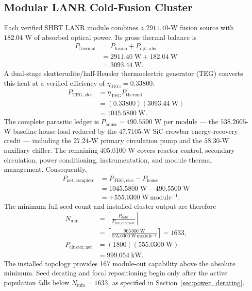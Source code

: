 \documentclass[10pt,twocolumn]{IEEEtran}
\begin{document}
\subsection{Modular LANR Cold-Fusion Cluster}

Each verified SHBT LANR module combines a $2911.40$-W fusion source with $182.04$ W of absorbed optical power.  Its gross thermal balance is
\begin{equation}
\begin{aligned}
P_{\mathrm{thermal}}
&=P_{\mathrm{fusion}}+P_{\mathrm{opt,abs}} \\
&=2911.40\;\mathrm{W}+182.04\;\mathrm{W} \\
&=3093.44\;\mathrm{W}.
\end{aligned}
\label{eq:lanr_module_thermal}
\end{equation}
A dual-stage skutterudite/half-Heusler thermoelectric generator (TEG) converts this heat at a verified efficiency of $\eta_{\mathrm{TEG}}=0.33800$:
\begin{equation}
\begin{aligned}
P_{\mathrm{TEG,elec}}
&=\eta_{\mathrm{TEG}}P_{\mathrm{thermal}} \\
&=(0.33800)(3093.44\;\mathrm{W}) \\
&=1045.5800\;\mathrm{W}.
\end{aligned}
\label{eq:teg_gross_output}
\end{equation}
The complete parasitic ledger is $P_{\mathrm{house}}=490.5500$ W per module --- the $538.2605$-W baseline house load reduced by the $47.7105$-W SiC crowbar energy-recovery credit --- including the $27.24$-W primary circulation pump and the $58.30$-W auxiliary chiller.  The remaining $405.0100$ W covers reactor control, secondary circulation, power conditioning, instrumentation, and module thermal management.  Consequently,
\begin{equation}
\begin{aligned}
P_{\mathrm{net,complete}}
&=P_{\mathrm{TEG,elec}}-P_{\mathrm{house}} \\
&=1045.5800\;\mathrm{W}-490.5500\;\mathrm{W} \\
&=+555.0300\;\mathrm{W\,module^{-1}}.
\end{aligned}
\label{eq:lanr_net_complete}
\end{equation}
The minimum full-seed count and installed-cluster output are therefore
\begin{equation}
\begin{aligned}
N_{\min}
&=\left\lceil\frac{P_{\mathrm{debt}}}
{P_{\mathrm{net,complete}}}\right\rceil \\
&=\left\lceil\frac{906\,000\;\mathrm{W}}
{555.0300\;\mathrm{W\,module^{-1}}}\right\rceil
=1633, \\
P_{\mathrm{cluster,net}}
&=(1800)(555.0300\;\mathrm{W}) \\
&=999.054\;\mathrm{kW}.
\end{aligned}
\label{eq:lanr_cluster_sizing}
\end{equation}
The installed topology provides 167 module-out capability above the absolute
minimum.  Seed derating and focal repositioning begin only after the active
population falls below $N_{\min}=1633$, as specified in
Section~\ref{sec:power_derating}.
\end{document}
